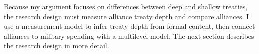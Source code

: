 \documentclass[12pt]{article}
\begin{document}
%
%
%
%
%
%
%
%
%
%
%


Because my argument focuses on differences between deep and shallow treaties, the research design must measure alliance treaty depth and compare alliances.  
I use a measurement model to infer treaty depth from formal content, then connect alliances to military spending with a multilevel model. 
The next section describes the research design in more detail. 
\end{document}
